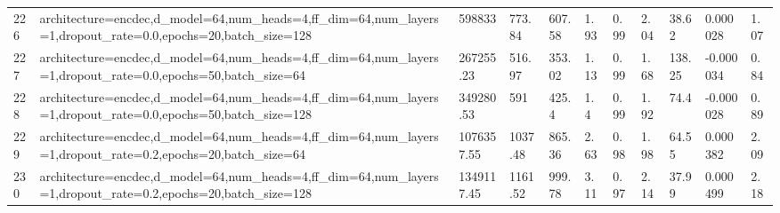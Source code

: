 \begin{longtable}{C{0.8cm} L{2cm} C{1.15cm} C{1.15cm} C{1.15cm} C{1.15cm} C{0.85cm} C{1.25cm} C{1.2cm} C{1.5cm} C{1.0cm}}
226 & architecture=encdec,\newline d\_model=64,\newline num\_heads=4,\newline ff\_dim=64,\newline num\_layers=1,\newline dropout\_rate=0.0,\newline epochs=20,\newline batch\_size=128 & 598833 & 773.84 & 607.58 & 1.93 & 0.99 & 2.04 & 38.62 & 0.000028 & 1.07 \\
227 & architecture=encdec,\newline d\_model=64,\newline num\_heads=4,\newline ff\_dim=64,\newline num\_layers=1,\newline dropout\_rate=0.0,\newline epochs=50,\newline batch\_size=64 & 267255.23 & 516.97 & 353.02 & 1.13 & 0.99 & 1.68 & 138.25 & -0.000034 & 0.84 \\
228 & architecture=encdec,\newline d\_model=64,\newline num\_heads=4,\newline ff\_dim=64,\newline num\_layers=1,\newline dropout\_rate=0.0,\newline epochs=50,\newline batch\_size=128 & 349280.53 & 591 & 425.4 & 1.4 & 0.99 & 1.92 & 74.4 & -0.000028 & 0.89 \\
229 & architecture=encdec,\newline d\_model=64,\newline num\_heads=4,\newline ff\_dim=64,\newline num\_layers=1,\newline dropout\_rate=0.2,\newline epochs=20,\newline batch\_size=64 & 1076357.55 & 1037.48 & 865.36 & 2.63 & 0.98 & 1.98 & 64.55 & 0.000382 & 2.09 \\
230 & architecture=encdec,\newline d\_model=64,\newline num\_heads=4,\newline ff\_dim=64,\newline num\_layers=1,\newline dropout\_rate=0.2,\newline epochs=20,\newline batch\_size=128 & 1349117.45 & 1161.52 & 999.78 & 3.11 & 0.97 & 2.14 & 37.99 & 0.000499 & 2.18 \\

\end{longtable}
